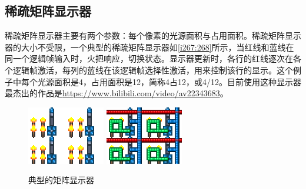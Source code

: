 \subsection{稀疏矩阵显示器}
稀疏矩阵显示器主要有两个参数：每个像素的光源面积与占用面积。稀疏矩阵显示器的大小不受限，一个典型的稀疏矩阵显示器如\autoref{i267:268}所示，当红线和蓝线在同一个逻辑帧输入时，火把响应，切换状态。显示器更新时，各行的红线逐次在各个逻辑帧激活，每列的蓝线在该逻辑帧选择性激活，用来控制该行的显示。这个例子中每个光源面积是4，占用面积是12，简称4占12，或4/12。目前使用这种显示器最杰出的作品是\url{https://www.bilibili.com/video/av22343683}。
\begin{figure}[!ht]
\centering
\includegraphics{images/267.png}
\qquad
\includegraphics{images/268.png}
\caption{典型的矩阵显示器}
\label{i267:268}
\end{figure}

